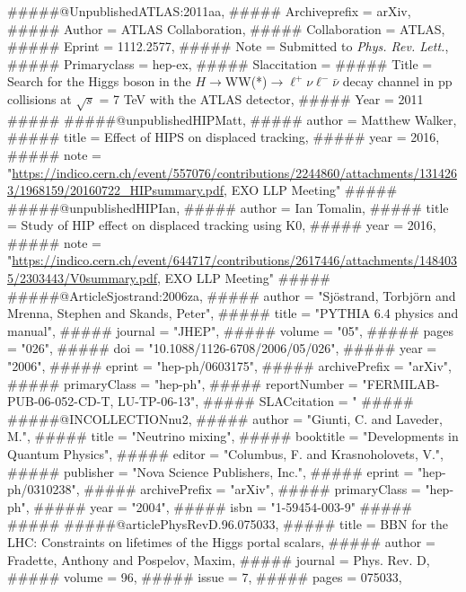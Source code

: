 #####@Unpublished{ATLAS:2011aa,
#####        Archiveprefix = {arXiv},
#####        Author = {{ATLAS Collaboration}},
#####        Collaboration = {ATLAS},
#####        Eprint = {1112.2577},
#####        Note = {Submitted to \textit{Phys. Rev. Lett.}},
#####        Primaryclass = {hep-ex},
#####        Slaccitation = {%
#####        Title = {Search for the {H}iggs boson in the {$H\to$WW(*)$\to \ell^+ \nu \ell^- \bar{\nu}$} decay channel in pp collisions at $\sqrt{s}$ = 7 {TeV} with the {ATLAS} detector},
#####        Year = {2011}}
#####%
#####@unpublished{HIPMatt,
#####  author = {Matthew Walker},
#####  title = {{Effect of HIPS on displaced tracking}},
#####  year = {2016},
#####  note = "\url{https://indico.cern.ch/event/557076/contributions/2244860/attachments/1314263/1968159/20160722_HIPsummary.pdf}, EXO LLP Meeting"
#####}
#####@unpublished{HIPIan,
#####  author = {Ian Tomalin},
#####  title = {{Study of HIP effect on displaced tracking using K0}},
#####  year = {2016},
#####  note = "\url{https://indico.cern.ch/event/644717/contributions/2617446/attachments/1484035/2303443/V0summary.pdf}, EXO LLP Meeting"
#####}
#####@Article{Sjostrand:2006za,
#####      author         = "Sj{\"o}strand, Torbj{\"o}rn and Mrenna, Stephen and Skands, Peter",
#####      title          = "{PYTHIA} 6.4 physics and manual",
#####      journal        = "JHEP",
#####      volume         = "05",
#####      pages          = "026",
#####      doi            = "10.1088/1126-6708/2006/05/026",
#####      year           = "2006",
#####      eprint         = "hep-ph/0603175",
#####      archivePrefix  = "arXiv",
#####      primaryClass   = "hep-ph",
#####      reportNumber   = "FERMILAB-PUB-06-052-CD-T, LU-TP-06-13",
#####      SLACcitation   = "%
#####}
#####@INCOLLECTION{nu2,
#####    author        = "Giunti, C. and Laveder, M.",
#####    title         = "Neutrino mixing",
#####    booktitle     = "Developments in Quantum Physics",
#####    editor        = "Columbus, F. and Krasnoholovets, V.",
#####    publisher     = "Nova Science Publishers, Inc.",
#####    eprint        = "hep-ph/0310238",
#####    archivePrefix = "arXiv",
#####    primaryClass  = "hep-ph",
#####    year          = "2004",
#####    isbn          = "1-59454-003-9"
#####}
#####
#####@article{PhysRevD.96.075033,
#####  title = {BBN for the LHC: Constraints on lifetimes of the Higgs portal scalars},
#####  author = {Fradette, Anthony and Pospelov, Maxim},
#####  journal = {Phys. Rev. D},
#####  volume = {96},
#####  issue = {7},
#####  pages = {075033},
}}
